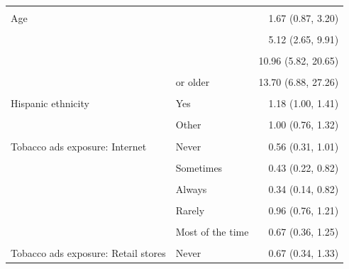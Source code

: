 \begin{longtable}[t]{>{\raggedright\arraybackslash}p{5cm}>{\raggedright\arraybackslash}p{5.5cm}r}
\endfoot
\bottomrule
\endlastfoot
\cellcolor{gray!6}{(Intercept)} & \cellcolor{gray!6}{} & \cellcolor{gray!6}{0.01 (0.00, 0.03)}\\
Age & 12 & 1.67 (0.87, 3.20)\\
\cellcolor{gray!6}{} & \cellcolor{gray!6}{13} & \cellcolor{gray!6}{2.64 (1.28, 5.43)}\\
 & 14 & 5.12 (2.65, 9.91)\\
\cellcolor{gray!6}{} & \cellcolor{gray!6}{15} & \cellcolor{gray!6}{9.33 (4.82, 18.05)}\\
\addlinespace
 & 16 & 10.96 (5.82, 20.65)\\
\cellcolor{gray!6}{} & \cellcolor{gray!6}{17} & \cellcolor{gray!6}{14.93 (7.96, 28.01)}\\
 & 18 or older & 13.70 (6.88, 27.26)\\
\cellcolor{gray!6}{Sex} & \cellcolor{gray!6}{Female} & \cellcolor{gray!6}{1.16 (0.99, 1.35)}\\
Hispanic ethnicity & Yes & 1.18 (1.00, 1.41)\\
\addlinespace
\cellcolor{gray!6}{Race} & \cellcolor{gray!6}{Black} & \cellcolor{gray!6}{0.79 (0.62, 1.01)}\\
 & Other & 1.00 (0.76, 1.32)\\
\cellcolor{gray!6}{} & \cellcolor{gray!6}{Not answered} & \cellcolor{gray!6}{0.97 (0.63, 1.51)}\\
Tobacco ads exposure: Internet & Never & 0.56 (0.31, 1.01)\\
\cellcolor{gray!6}{} & \cellcolor{gray!6}{Rarely} & \cellcolor{gray!6}{0.40 (0.21, 0.77)}\\
\addlinespace
 & Sometimes & 0.43 (0.22, 0.82)\\
\cellcolor{gray!6}{} & \cellcolor{gray!6}{Most of the time} & \cellcolor{gray!6}{0.46 (0.22, 0.99)}\\
 & Always & 0.34 (0.14, 0.82)\\
\cellcolor{gray!6}{Tobacco ads exposure: Newspapers/Magazines} & \cellcolor{gray!6}{Never} & \cellcolor{gray!6}{1.11 (0.87, 1.40)}\\
 & Rarely & 0.96 (0.76, 1.21)\\
\addlinespace
\cellcolor{gray!6}{} & \cellcolor{gray!6}{Sometimes} & \cellcolor{gray!6}{0.83 (0.60, 1.16)}\\
 & Most of the time & 0.67 (0.36, 1.25)\\
\cellcolor{gray!6}{} & \cellcolor{gray!6}{Always} & \cellcolor{gray!6}{1.07 (0.42, 2.74)}\\
Tobacco ads exposure: Retail stores & Never & 0.67 (0.34, 1.33)\\

\end{longtable}
